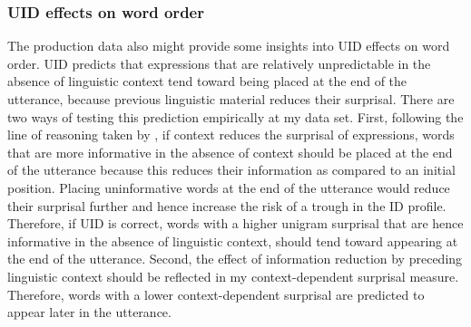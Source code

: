 \subsubsection{UID effects on word order}
\label{sec:scripts-production-results-uniformity}
The production data also might provide some insights into UID effects on word order. UID predicts that expressions that are relatively unpredictable in the absence of linguistic context tend toward being placed at the end of the utterance, because previous linguistic material reduces their surprisal. There are two ways of testing this prediction empirically at my data set. First, following the line of reasoning taken by \citet{genzel.charniak2002}, if context reduces the surprisal of expressions, words that are more informative in the absence of context should be placed at the end of the utterance because this reduces their information as compared to an initial position. Placing uninformative words at the end of the utterance would reduce their surprisal further and hence increase the risk of a trough in the ID profile. Therefore, if UID is correct, words with a higher unigram surprisal that are hence informative in the absence of linguistic context, should tend toward appearing at the end of the utterance. Second, the effect of information reduction by preceding linguistic context should be reflected in my context-dependent surprisal measure. Therefore, words with a lower context-dependent surprisal are predicted to appear later in the utterance.

